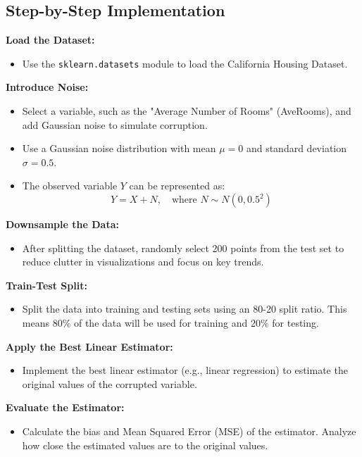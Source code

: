 \documentclass{article}
\begin{document}
\subsection*{Step-by-Step Implementation}

\textbf{Load the Dataset:}
\begin{itemize}
    \item Use the \texttt{sklearn.datasets} module to load the California Housing Dataset.
\end{itemize}

\textbf{Introduce Noise:}
\begin{itemize}
    \item Select a variable, such as the "Average Number of Rooms" (AveRooms), and add Gaussian noise to simulate corruption. 
    \item Use a Gaussian noise distribution with mean $\mu = 0$ and standard deviation $\sigma = 0.5$.
    \item The observed variable $Y$ can be represented as:
    \[
    Y = X + N, \quad \text{where } N \sim N(0, 0.5^2)
    \]
\end{itemize}

\textbf{Downsample the Data:}
\begin{itemize}
    \item After splitting the dataset, randomly select 200 points from the test set to reduce clutter in visualizations and focus on key trends. 
\end{itemize}

\textbf{Train-Test Split:}
\begin{itemize}
    \item Split the data into training and testing sets using an 80-20 split ratio. This means 80\% of the data will be used for training and 20\% for testing.
\end{itemize}

\textbf{Apply the Best Linear Estimator:}
\begin{itemize}
    \item Implement the best linear estimator (e.g., linear regression) to estimate the original values of the corrupted variable.
\end{itemize}

\textbf{Evaluate the Estimator:}
\begin{itemize}
    \item Calculate the bias and Mean Squared Error (MSE) of the estimator. Analyze how close the estimated values are to the original values.
\end{itemize}
\end{document}
